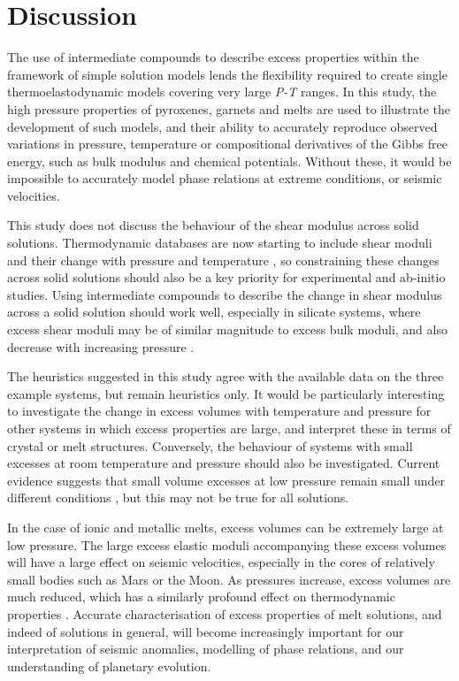 \section{Discussion}
The use of intermediate compounds to describe excess properties within the framework of simple solution models lends the flexibility required to create single thermoelastodynamic models covering very large \emph{P-T} ranges. In this study, the high pressure properties of pyroxenes, garnets and melts are used to illustrate the development of such models, and their ability to accurately reproduce observed variations in pressure, temperature or compositional derivatives of the Gibbs free energy, such as bulk modulus and chemical potentials. Without these, it would be impossible to accurately model phase relations at extreme conditions, or seismic velocities.

This study does not discuss the behaviour of the shear modulus across solid solutions. Thermodynamic databases are now starting to include shear moduli and their change with pressure and temperature \citep{SLB2011}, so constraining these changes across solid solutions should also be a key priority for experimental and ab-initio studies. Using intermediate compounds to describe the change in shear modulus across a solid solution should work well, especially in silicate systems, where excess shear moduli may be of similar magnitude to excess bulk moduli, and also decrease with increasing pressure \citep[e.g][]{LEDD2014}.

The heuristics suggested in this study agree with the available data on the three example systems, but remain heuristics only. It would be particularly interesting to investigate the change in excess volumes with temperature and pressure for other systems in which excess properties are large, and interpret these in terms of crystal or melt structures. Conversely, the behaviour of systems with small excesses at room temperature and pressure should also be investigated. Current evidence suggests that small volume excesses at low pressure remain small under different conditions \citep{FXMLX2015, HC2014}, but this may not be true for all solutions.

In the case of ionic and metallic melts, excess volumes can be extremely large at low pressure. The large excess elastic moduli accompanying these excess volumes will have a large effect on seismic velocities, especially in the cores of relatively small bodies such as Mars or the Moon. As pressures increase, excess volumes are much reduced, which has a similarly profound effect on thermodynamic properties \citep{Frostetal2010, DKS2013}. Accurate characterisation of excess properties of melt solutions, and indeed of solutions in general, will become increasingly important for our interpretation of seismic anomalies, modelling of phase relations, and our understanding of planetary evolution. 

